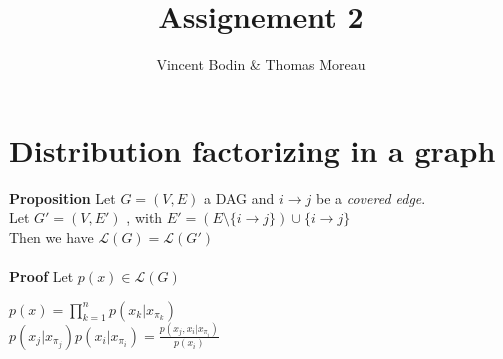 \documentclass[11pt]{article}
\title{\textbf{Assignement 2}}
\author{Vincent Bodin \& Thomas Moreau}
\date{}
\begin{document}
\maketitle

\section{Distribution factorizing in a graph}

\textbf{Proposition} Let $G = (V, E)$ a DAG and $i \rightarrow j$ be a \textit{covered edge}.\\
Let  $G' = (V, E')$ , with $E' = (E\setminus\{i\rightarrow j\})\cup \{i \rightarrow j\}$\\
Then we have $\mathcal{L}(G) = \mathcal{L}(G')$\\
\\
\textbf{Proof}  Let $p(x) \in \mathcal{L}(G)$\\
\begin{center}
$p(x) = \prod_{k=1}^{n} p(x_k | x_{\pi_k})$\\
$p(x_j | x_{\pi_j}) p(x_i | x_{\pi_i}) = \frac{p(x_j, x_i | x_{\pi_i})}{p(x_i)} $\\
\end{center}
\end{document}
